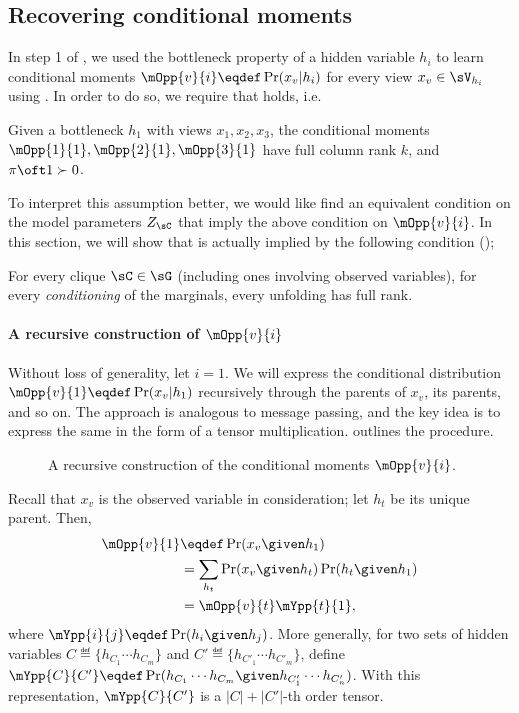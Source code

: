 \subsection{Recovering conditional moments}
\label{app:assumption-proof}

In step 1 of \LearnMarginals, we used the bottleneck property of a hidden
  variable $h_i$ to learn conditional moments $\mOpp{v}{i} \eqdef
  \Pr(x_v | h_i)$ for every view $x_v \in \sV_{h_i}$ using
  \TensorFactorize. 
In order to do so, we require that  holds, i.e.
\begin{assumption*}
  Given a bottleneck $h_1$ with views $x_1, x_2, x_3$, the conditional
  moments $\mOpp{1}{1}, \mOpp{2}{1}, \mOpp{3}{1}$ have full column rank
  $k$, and $\pi\oft 1 \succ 0$.
\end{assumption*}

To interpret this assumption better, we would like find an equivalent
condition on the model parameters $Z_\sC$ that imply the above condition
on $\mOpp{v}{i}$. In this section, we will show that
 is actually implied by the following condition
();
\begin{assumption*}
For every clique $\sC \in \sG$ (including ones involving observed
  variables), for every {\em conditioning} of the marginals, every
  unfolding has full rank. 
\end{assumption*}

\paragraph{A recursive construction of $\mOpp{v}{i}$}

Without loss of generality, let $i = 1$. We will express the conditional
distribution $\mOpp{v}{1} \eqdef \Pr(x_v | h_1)$ recursively through the
parents of $x_v$, its parents, and so on. The approach is analogous to
message passing, and the key idea is to express the same in the form of
a tensor multiplication.  outlines the
procedure.

\begin{figure}
  \caption{A recursive construction of the conditional moments $\mOpp{v}{i}$.}
  \label{fig:message-proof}
\end{figure}

Recall that $x_v$ is the observed variable in consideration; let $h_t$
be its unique parent. Then, 
\begin{align*}
  \mOpp{v}{1} &\eqdef \Pr( x_v \given h_1 )  \\
              &= \sum_{h_t} \Pr( x_v \given h_t ) \Pr( h_t \given h_1 ) \\
              &= \mOpp{v}{t} \mYpp{t}{1},
\end{align*}
where $\mYpp{i}{j} \eqdef \Pr( h_i \given h_j )$. 
More generally, for two sets of hidden variables $C \eqdef \{h_{C_1}
\cdots h_{C_m} \}$ and $C' \eqdef \{h_{C'_1} \cdots h_{C'_m} \}$, 
define $\mYpp{C}{C'} \eqdef \Pr( h_{C_1} \cdots h_{C_m} \given h_{C'_1}
\cdots h_{C'_n} )$. 
With this representation, $\mYpp{C}{C'}$ is a $|C| + |C'|$-th order
tensor.
  
